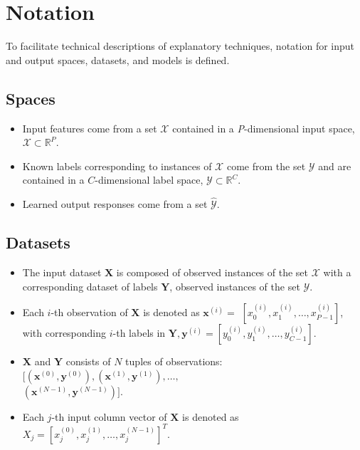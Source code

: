 \documentclass[11pt]{asaproc}
\begin{document}
\section{Notation} \label{sec:notation}

To facilitate technical descriptions of explanatory techniques, notation for input and output spaces, datasets, and models is defined.

\subsection{Spaces} 
 
	\begin{itemize}
		\item Input features come from a set $\mathcal{X}$ contained in a \textit{P}-dimensional input space, $\mathcal{X} \subset \mathbb{R}^P$.  
		\item Known labels corresponding to instances of $\mathcal{X}$ come from the set $\mathcal{Y}$ and are contained in a $C$-dimensional label space, $\mathcal{Y} \subset \mathbb{R}^C$.
		\item Learned output responses come from a set $\mathcal{\hat{Y}}$. %
	\end{itemize}	
	
\subsection{Datasets} 

	\begin{itemize}
		\item The input dataset $\mathbf{X}$ is composed of observed instances of the set $\mathcal{X}$ with a corresponding dataset of labels $\mathbf{Y}$, observed instances of the set $\mathcal{Y}$.
		\item Each $i$-th observation of $\mathbf{X}$ is denoted as $\mathbf{x}^{(i)} = $  
		$[x_0^{(i)}, x_1^{(i)}, \dots, x_{\textit{P}-1}^{(i)}]$, with corresponding $i$-th labels in $\mathbf{Y}, \mathbf{y}^{(i)} = [y_0^{(i)}, y_1^{(i)}, \dots, y_{\textit{C}-1}^{(i)}]$.
		\item $\mathbf{X}$ and $\mathbf{Y}$ consists of $N$ tuples of observations: $[(\mathbf{x}^{(0)},\mathbf{y}^{(0)}), (\mathbf{x}^{(1)},\mathbf{y}^{(1)}), \dots,$\\$(\mathbf{x}^{(N-1)},\mathbf{y}^{(N-1)})]$. %
		\item Each $j$-th input column vector of $\mathbf{X}$ is denoted as $X_j = [x_{j}^{(0)}, x_{j}^{(1)}, \dots, x_{j}^{(N-1)}]^T$.
	\end{itemize}	 
\end{document}

